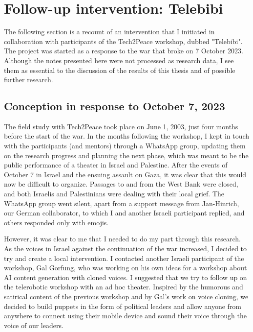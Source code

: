 \documentclass[dissertation,math,vertlayout,pdfa,colorlinks,nologo]{aaltoseries}
\begin{document}
\section{Follow-up intervention: Telebibi}
The following section is a recount of an intervention that I initiated in collaboration with participants of the Tech2Peace workshop, dubbed "Telebibi". The project was started as a response to the war that broke on 7 October 2023. Although the notes presented here were not processed as research data, I see them as essential to the discussion of the results of this thesis and of possible further research.
\subsection{Conception in response to October 7, 2023}
The field study with Tech2Peace took place on June 1, 2003, just four months before the start of the war. In the months following the workshop, I kept in touch with the participants (and mentors) through a WhatsApp group, updating them on the research progress and planning the next phase, which was meant to be the public performance of a theater in Israel and Palestine. After the events of October 7 in Israel and the ensuing assault on Gaza, it was clear that this would now be difficult to organize. Passages to and from the West Bank were closed, and both Israelis and Palestinians were dealing with their local grief. The WhatsApp group went silent, apart from a support message from Jan-Hinrich, our German collaborator, to which I and another Israeli participant replied, and others responded only with emojis. 

However, it was clear to me that I needed to do my part through this research. As the voices in Israel against the continuation of the war increased, I decided to try and create a local intervention. I contacted another Israeli participant of the workshop, Gal Gorfung, who was working on his own ideas for a workshop about AI content generation with cloned voices. I suggested that we try to follow up on the telerobotic workshop with an ad hoc theater. Inspired by the humorous and satirical content of the previous workshop and by Gal's work on voice cloning, we decided to build puppets in the form of political leaders and allow anyone from anywhere to connect using their mobile device and sound their voice through the voice of our leaders.
\end{document}
